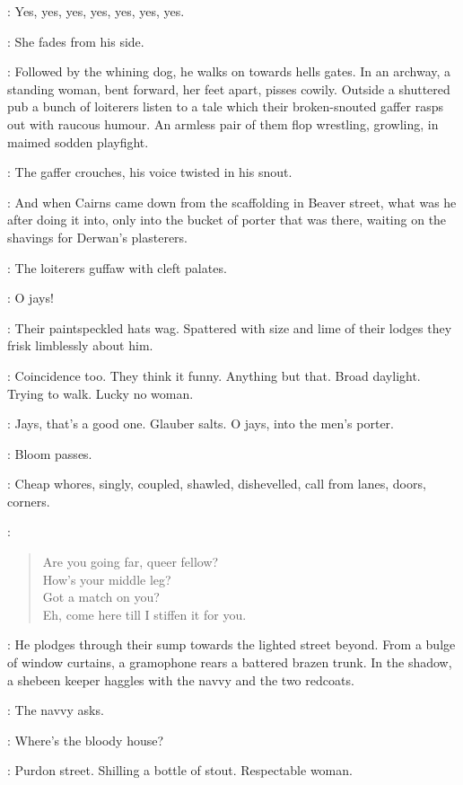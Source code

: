\MrsBreen:
Yes,
yes,
yes,
yes,
yes,
yes,
yes.

:
She fades from his side.

:
Followed by the whining dog,
he walks on towards hells gates.
In an archway,
a standing woman,
bent forward,
her feet apart,
pisses cowily.
Outside a shuttered pub a bunch of loiterers
listen to a tale which their broken-snouted gaffer rasps out with raucous humour.
An armless pair of them flop wrestling,
growling,
in maimed sodden playfight.

:
The gaffer crouches,
his voice twisted in his snout.

\Gaffer:
And when Cairns came down from the scaffolding in Beaver street,
what was he after doing it into,
only into the bucket of porter that was there,
waiting on the shavings for Derwan's plasterers.

:
The loiterers guffaw with cleft palates.

\Loiterers:
O jays!

:
Their paintspeckled hats wag.
Spattered with size and lime of their lodges
they frisk limblessly about him.

\Bloom:
Coincidence too.
They think it funny.
Anything but that.
Broad daylight.
Trying to walk.
Lucky no woman.

\Loiterers:
Jays,
that's a good one.
Glauber salts.
O jays,
into the men's porter.

:
Bloom passes.

:
Cheap whores,
singly,
coupled,
shawled,
dishevelled,
call from lanes,
doors,
corners.

\Whores:
\begin{verse}
%
    Are you going far,
queer fellow?\\
    How's your middle leg?\\
    Got a match on you?\\
    Eh,
come here till I stiffen it for you.
\end{verse}

:
He plodges through their sump towards the lighted street beyond.
From a bulge of window curtains,
a gramophone rears a battered brazen trunk.
In the shadow,
a shebeen keeper haggles with the navvy and the two redcoats.

:
The navvy asks.

\Navvy:
Where's the bloody house?

\ShebeenKeeper[1]:
Purdon street.
Shilling a bottle of stout.
Respectable woman.

